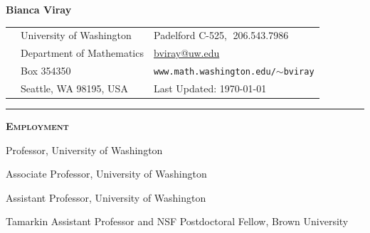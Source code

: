 \documentclass[12pt]{article}
\newcommand{\sectionheading}[1]
	{\bigskip %
	\noindent
	\hspace{-6.5mm}\textcolor{Gray}{\rule[.75mm]{21.5mm}{1mm}} %
	\hspace{.2mm}	%
	{\large{\textbf{\textsc{#1}}}} %
}
\newenvironment{date_section}
	{
	\vspace{-1ex}
	\leftmargini = 15ex
	 \begin{itemize}[
		 labelsep = *,
		 labelwidth = 9ex,
		 labelindent = 0ex,
		 itemindent = !,
		 font=\normalfont, 
		 align=parleft
		 ]
		{}
		\itemsep=-1.5mm}
	{\end{itemize}\vspace{-2ex}}
\newcommand{\yearrange}[2]{
	\item[ 
		{\makebox[1ex][r]{#1}}
		--
		{\makebox[1ex][l]{#2} }
		] }
\begin{document}

	\thispagestyle{empty}

	\centerline{{\LARGE \textbf{Bianca Viray}}}

	\vspace{3mm}

	\begin{center}
		\begin{tabular}[c]{lll} %
			\phantom{aaaaaaaaa} 	%
			& University of Washington 
				& Padelford C-525,$\;$ 206.543.7986\\
 			& Department of Mathematics
				& \url{bviray@uw.edu}\\
 			& Box 354350
                & \texttt{www.math.washington.edu/$\sim$bviray}\\
			& Seattle, WA 98195, USA
				& Last Updated: \today 
		\end{tabular}
	\end{center}
	

	\sectionheading{Employment}%
		
		\begin{date_section}

            \yearrange{2021}{} Professor, University of Washington

			\yearrange{2017}{2021} Associate Professor, University of Washington
			
			\yearrange{2014}{2017} Assistant Professor, University of Washington
			
			\yearrange{2010}{2014} Tamarkin Assistant Professor and
				NSF Postdoctoral Fellow, Brown University
			
		\end{date_section}
\end{document}
